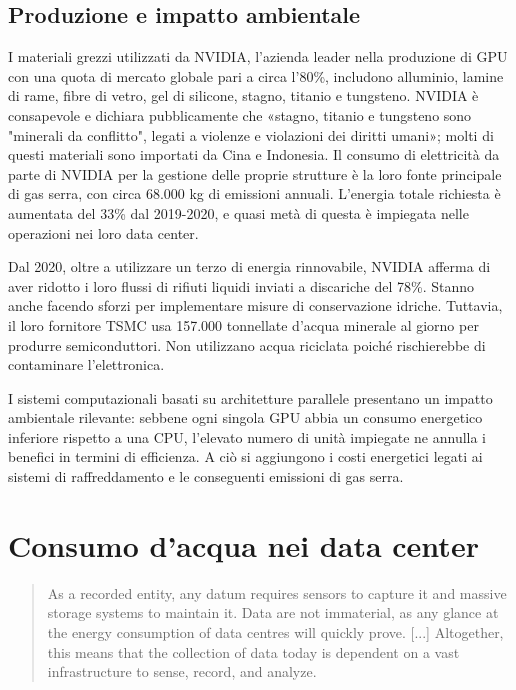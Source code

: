 \documentclass[12pt,a4paper,oneside]{book}
\begin{document}
\section{Produzione e impatto ambientale}

I materiali grezzi utilizzati da NVIDIA, l'azienda leader nella produzione di GPU con una quota di mercato globale pari a circa l'80\%, includono alluminio, lamine di rame, fibre di vetro, gel di silicone, stagno, titanio e tungsteno. NVIDIA è consapevole e dichiara pubblicamente che «stagno, titanio e tungsteno sono "minerali da conflitto"\citep[p.36]{nvidia2021report}, legati a violenze e violazioni dei diritti umani»; molti di questi materiali sono importati da Cina e Indonesia.
Il consumo di elettricità da parte di NVIDIA per la gestione delle proprie strutture è la loro fonte principale di gas serra, con circa 68.000 kg di emissioni annuali. L'energia totale richiesta è aumentata del 33\% dal 2019-2020, e quasi metà di questa è impiegata nelle operazioni nei loro data center.

Dal 2020, oltre a utilizzare un terzo di energia rinnovabile, NVIDIA afferma di aver ridotto i loro flussi di rifiuti liquidi inviati a discariche del 78\%. Stanno anche facendo sforzi per implementare misure di conservazione idriche. Tuttavia, il loro fornitore TSMC usa 157.000 tonnellate d'acqua minerale al giorno per produrre semiconduttori. Non utilizzano acqua riciclata poiché rischierebbe di contaminare l'elettronica.

I sistemi computazionali basati su architetture parallele presentano un impatto ambientale rilevante: sebbene ogni singola GPU abbia un consumo energetico inferiore rispetto a una CPU, l'elevato numero di unità impiegate ne annulla i benefici in termini di efficienza. A ciò si aggiungono i costi energetici legati ai sistemi di raffreddamento e le conseguenti emissioni di gas serra.

\chapter{Consumo d'acqua nei data center}

\begin{quote}
\small
As a recorded entity, any datum requires sensors to capture it and massive storage systems to maintain it. Data are not immaterial, as any glance at the energy consumption of data centres will quickly prove. [...] Altogether, this means that the collection of data today is dependent on a vast infrastructure to sense, record, and analyze.\citep[p.28]{srnicek2017platform}
\end{quote}
\end{document}
